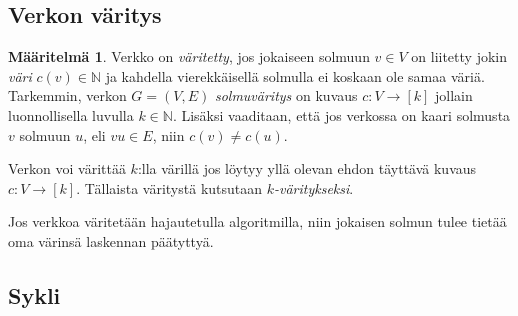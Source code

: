 \documentclass[finnish]{tktltiki2}
\theoremstyle{definition}
\newtheorem{maar}[lau]{Määritelmä}
\theoremstyle{remark}
\newcommand{\nat}{\mathbb{N}}
\newcommand{\from}{\colon}
\begin{document}
\subsection{Verkon väritys}

\begin{maar}
    Verkko on \emph{väritetty}, jos jokaiseen solmuun $v \in V$ on liitetty jokin
    \emph{väri} $c(v) \in \nat$ ja kahdella vierekkäisellä solmulla ei koskaan ole
    samaa väriä.  Tarkemmin, verkon $G = (V,E)$ \emph{solmuväritys} on kuvaus $c \from
    V \to [k]$ jollain luonnollisella luvulla $k \in \nat$.
    Lisäksi vaaditaan, että jos verkossa on kaari solmusta $v$ solmuun $u$, eli $vu
    \in E$, niin $c(v) \neq c(u)$.

    Verkon voi värittää $k$:lla värillä jos löytyy yllä olevan ehdon täyttävä
    kuvaus $c \from V \to [k]$. Tällaista väritystä kutsutaan
    \emph{$k$-väritykseksi}.
\end{maar}


\begin{center}
\end{center}

Jos verkkoa väritetään hajautetulla algoritmilla, niin jokaisen solmun tulee
tietää oma värinsä laskennan päätyttyä.

\subsection{Sykli}
\end{document}
